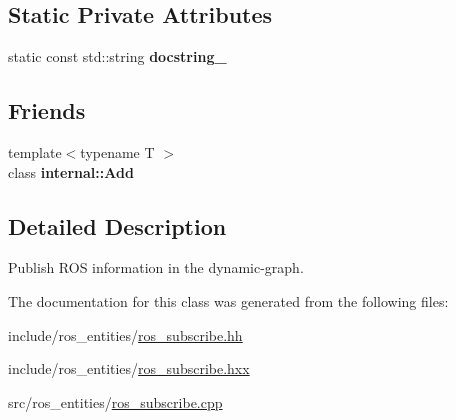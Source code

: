 \subsection*{Static Private Attributes}
\begin{DoxyCompactItemize}
\item 
\mbox{\label{classdynamic__graph_1_1RosSubscribe_a43579b54927302d427976ba218b2636b}} 
static const std\+::string {\bfseries docstring\+\_\+}
\end{DoxyCompactItemize}
\subsection*{Friends}
\begin{DoxyCompactItemize}
\item 
\mbox{\label{classdynamic__graph_1_1RosSubscribe_aff86e359edc93019ec7be05f8207a40d}} 
{\footnotesize template$<$typename T $>$ }\\class {\bfseries internal\+::\+Add}
\end{DoxyCompactItemize}


\subsection{Detailed Description}
Publish R\+OS information in the dynamic-\/graph. 

The documentation for this class was generated from the following files\+:\begin{DoxyCompactItemize}
\item 
include/ros\+\_\+entities/\hyperlink{ros__subscribe_8hh}{ros\+\_\+subscribe.\+hh}\item 
include/ros\+\_\+entities/\hyperlink{ros__subscribe_8hxx}{ros\+\_\+subscribe.\+hxx}\item 
src/ros\+\_\+entities/\hyperlink{ros__subscribe_8cpp}{ros\+\_\+subscribe.\+cpp}\end{DoxyCompactItemize}
